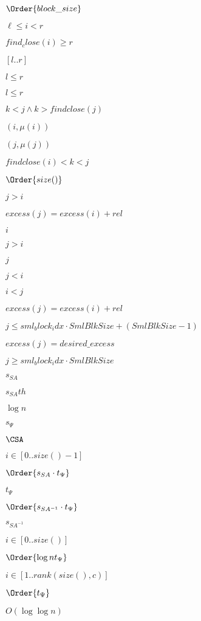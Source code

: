 \documentclass{article}
\begin{document}
$ \Order{block\_size} $
\pagebreak

$ \ell \leq i < r $
\pagebreak

$ find_close(i) \geq r $
\pagebreak

$[l..r]$
\pagebreak

$l\leq r$
\pagebreak

$l \leq r$
\pagebreak

$ k<j \wedge k>findclose(j) $
\pagebreak

$(i,\mu(i))$
\pagebreak

$(j,\mu(j))$
\pagebreak

$ findclose(i) < k < j$
\pagebreak

$ \Order{size()}$
\pagebreak

$ j>i $
\pagebreak

$ excess(j) = excess(i)+rel $
\pagebreak

$i$
\pagebreak

$ j>i$
\pagebreak

$j$
\pagebreak

$ j<i $
\pagebreak

$i<j$
\pagebreak

$ excess(j) = excess(i)+rel$
\pagebreak

$ j \leq sml_block_idx\cdot SmlBlkSize+(SmlBlkSize-1) $
\pagebreak

$ excess(j)=desired\_excess $
\pagebreak

$ j \geq sml_block_idx\cdot SmlBlkSize $
\pagebreak

$s_{SA}$
\pagebreak

$s_{SA}th$
\pagebreak

$\log n$
\pagebreak

$s_{\Psi}$
\pagebreak

$\CSA$
\pagebreak

$ i \in [0..size()-1]$
\pagebreak

$ \Order{s_{SA}\cdot t_{\Psi}} $
\pagebreak

$t_{\Psi}$
\pagebreak

$ \Order{s_{SA^{-1}}\cdot t_{\Psi}} $
\pagebreak

$s_{SA^{-1}}$
\pagebreak

$i\in [0..size()]$
\pagebreak

$ \Order{\log n t_{\Psi}} $
\pagebreak

$i\in [1..rank(size(),c)]$
\pagebreak

$ \Order{t_{\Psi}} $
\pagebreak

$O(\log\log n)$
\pagebreak
\end{document}
